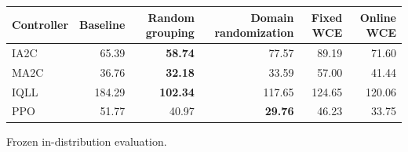 \begin{tabular}{lrrrrr}
\hline
Controller & Baseline & Random grouping & Domain randomization & Fixed WCE & Online WCE \\
\hline
IA2C & 65.39 & \textbf{58.74} & 77.57 & 89.19 & 71.60 \\
MA2C & 36.76 & \textbf{32.18} & 33.59 & 57.00 & 41.44 \\
IQLL & 184.29 & \textbf{102.34} & 117.65 & 124.65 & 120.06 \\
PPO & 51.77 & 40.97 & \textbf{29.76} & 46.23 & 33.75 \\
\hline
\end{tabular}
Frozen in-distribution evaluation.
